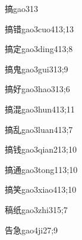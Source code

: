 \begin{verbete}{搞}{gao3}{13}
\end{verbete}

\begin{verbete}{搞错}{gao3cuo4}{13;13}
\end{verbete}

\begin{verbete}{搞定}{gao3ding4}{13;8}
\end{verbete}

\begin{verbete}{搞鬼}{gao3gui3}{13;9}
\end{verbete}

\begin{verbete}{搞好}{gao3hao3}{13;6}
\end{verbete}

\begin{verbete}{搞混}{gao3hun4}{13;11}
\end{verbete}

\begin{verbete}{搞乱}{gao3luan4}{13;7}
\end{verbete}

\begin{verbete}{搞钱}{gao3qian2}{13;10}
\end{verbete}

\begin{verbete}{搞通}{gao3tong1}{13;10}
\end{verbete}

\begin{verbete}{搞笑}{gao3xiao4}{13;10}
\end{verbete}

\begin{verbete}{稿纸}{gao3zhi3}{15;7}
\end{verbete}

\begin{verbete}{告急}{gao4ji2}{7;9}
\end{verbete}

